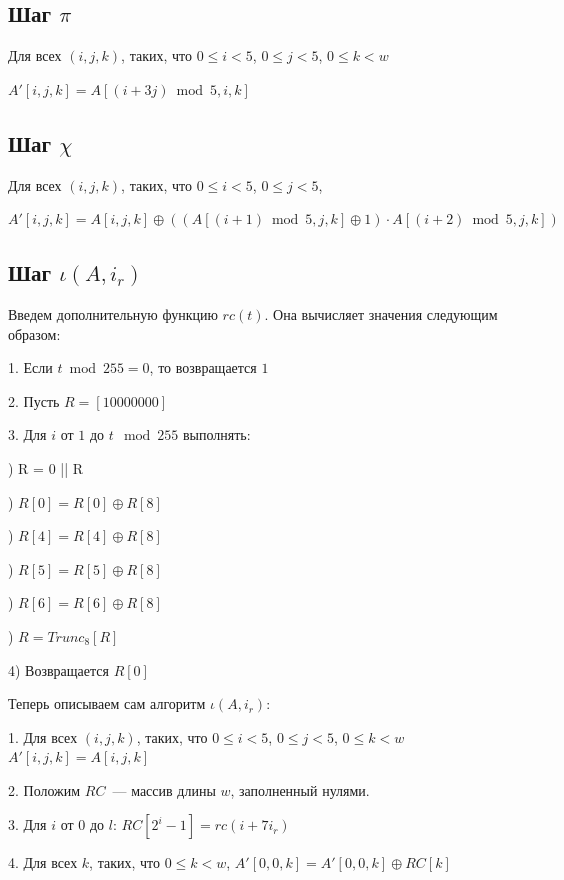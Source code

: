 \documentclass[a4paper,12pt]{article}
\theoremstyle{plain} %
\theoremstyle{definition} %
\theoremstyle{remark} %
\begin{document}
	\subsection{Шаг $\pi$}
	
	Для всех $(i, j, k)$, таких, что $0 \leqslant i < 5$, $0 \leqslant j < 5$, $0 \leqslant k < w$
	
	$A'[i,j,k] = A[(i + 3j) \bmod 5, i, k]$
	
	\subsection{Шаг $\chi$}
	
	Для всех $(i, j, k)$, таких, что $0 \leqslant i < 5$, $0 \leqslant j < 5$,
	
	$A'[i,j,k] = A[i,j,k] \oplus ((A[(i+1) \bmod 5, j, k] \oplus 1) \cdot A[(i+2) \bmod 5, j, k])$
	
	\subsection{Шаг $\iota(A,i_r)$}
	
	Введем дополнительную функцию $rc(t)$. Она вычисляет значения следующим образом:
	
	1. Если $t \bmod 255 = 0$, то возвращается $1$
	
	2. Пусть $R = [1  0  0  0  0  0  0  0]$
	
	3.  Для $i$ от $1$ до $t\mod 255$ выполнять:
	
) R = 0 || R
	
) $R[0] = R[0] \oplus R[8]$
	
) $R[4] = R[4] \oplus R[8]$
	
) $R[5] = R[5] \oplus R[8]$
	
) $R[6] = R[6] \oplus R[8]$
	
) $R = Trunc_8[R]$
	
	4) Возвращается $R[0]$
	
	\newpage
	
	Теперь описываем сам алгоритм $\iota(A,i_r)$:
	
	1. Для всех $(i, j, k)$, таких, что $0 \leqslant i < 5$, $0 \leqslant j < 5$, $0 \leqslant k < w$ $A'[i,j,k] = A[i,j,k]$
	
	2. Положим $RC$ — массив длины $w$, заполненный нулями.
	
	3. Для $i$ от 0 до $l$: $RC[2^i - 1] = rc(i + 7i_r)$
	
	4. Для всех $k$, таких, что $0 \leqslant k < w$, $A'[0,0,k] = A'[0,0,k] \oplus RC[k]$
	
\end{document}
